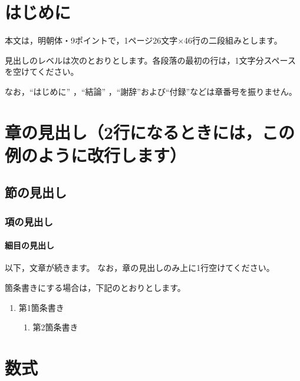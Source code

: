 \documentclass{shirobyoushi}
\begin{document}
\maketitle

\section*{はじめに}

本文は，明朝体・9ポイントで，1ページ26文字×46行の二段組みとします。

見出しのレベルは次のとおりとします。各段落の最初の行は，1文字分スペースを空けてください。

なお，“はじめに” ，“結論” ，“謝辞”および“付録”などは章番号を振りません。

\section{章の見出し（2行になるときには，この例のように改行します）}

\subsection{節の見出し}

\subsubsection{項の見出し}

\paragraph{細目の見出し}

以下，文章が続きます。
なお，章の見出しのみ上に1行空けてください。

箇条書きにする場合は，下記のとおりとします。
\begin{enumerate}
  \item 第1箇条書き
    \begin{enumerate}
      \item 第2箇条書き
    \end{enumerate}
\end{enumerate}

\section{数式}
\end{document}
